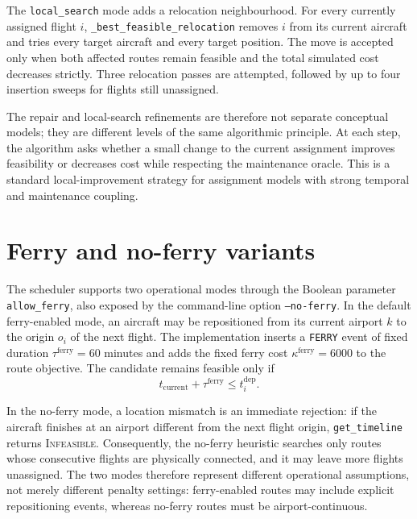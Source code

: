 The \texttt{local\_search} mode adds a relocation neighbourhood. For every currently assigned flight $i$, \texttt{\_best\_feasible\_relocation} removes $i$ from its current aircraft and tries every target aircraft and every target position. The move is accepted only when both affected routes remain feasible and the total simulated cost decreases strictly. Three relocation passes are attempted, followed by up to four insertion sweeps for flights still unassigned.

The repair and local-search refinements are therefore not separate conceptual models; they are different levels of the same algorithmic principle. At each step, the algorithm asks whether a small change to the current assignment improves feasibility or decreases cost while respecting the maintenance oracle. This is a standard local-improvement strategy for assignment models with strong temporal and maintenance coupling.

\section{Ferry and no-ferry variants}
\label{sec:heuristic_ferry}

The scheduler supports two operational modes through the Boolean parameter \texttt{allow\_ferry}, also exposed by the command-line option \texttt{--no-ferry}. In the default ferry-enabled mode, an aircraft may be repositioned from its current airport $k$ to the origin $o_i$ of the next flight. The implementation inserts a \texttt{FERRY} event of fixed duration $\tau^{\mathrm{ferry}}=60$ minutes and adds the fixed ferry cost $\kappa^{\mathrm{ferry}}=6000$ to the route objective. The candidate remains feasible only if
\begin{equation}
    t_{\mathrm{current}} + \tau^{\mathrm{ferry}} \leq t_i^{\mathrm{dep}}.
\end{equation}

In the no-ferry mode, a location mismatch is an immediate rejection: if the aircraft finishes at an airport different from the next flight origin, \texttt{get\_timeline} returns \textsc{Infeasible}. Consequently, the no-ferry heuristic searches only routes whose consecutive flights are physically connected, and it may leave more flights unassigned. The two modes therefore represent different operational assumptions, not merely different penalty settings: ferry-enabled routes may include explicit repositioning events, whereas no-ferry routes must be airport-continuous.

